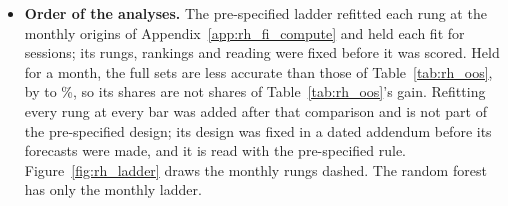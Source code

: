 \begin{itemize}
  ($k_{90} = \rhldEBTreeKninetyMax$ in the boosted trees and \rhldEBLinKninetyMax{} in the linear models), so under the
  reading fixed before the ladder was first scored the signal is \rhldEBAllBarVerdict{} in all five models, between
  concentrated (\rhldRuleKConc{} or fewer series) and dense and weak (no reduced rung at \rhldRulePct\%). Refitted
  monthly, the linear models read \rhldEBLinVerdictMonthly{} ($k_{90} = \rhldLinKninetyMax$). By day type
  (Table~\ref{tab:rh_channels_sparse}, Panel~B) the reading is \rhldEBLgbmOrdVerdict{} for LightGBM and XGBoost on
  ordinary days (\rhldEBTreeOrdKninetyMin{}--\rhldEBTreeOrdKninetyMax{} series keep \rhldRulePct\% of the gain) and
  for the linear models on FOMC statement days (\rhldEBLinEvKninetyMin{}--\rhldEBLinEvKninetyMax{} series), the two
  channels of Section~\ref{sec:rh_fi}. In the monthly version of the ladder, across windows of \rhcxWOne{} to
  \rhcxWLong{} trading days, the best number of series rises with the window, as a dense and weak signal predicts,
  only for \rhcxWhoKstarRisesBar{} (Appendix~\ref{app:rh_fi_scaling}); the window test is in
  Appendix~\ref{app:rh_fi_window}.
\item \textbf{Order of the analyses.} The pre-specified ladder refitted each rung at the \rhldNOrigins{} monthly
  origins of Appendix~\ref{app:rh_fi_compute} and held each fit for \rhldHoldSessions{} sessions; its rungs, rankings
  and reading were fixed before it was scored. Held for a month, the full sets are less accurate than those of
  Table~\ref{tab:rh_oos}, by \rhldPctMonthlyVsWalkMin{} to \rhldPctMonthlyVsWalkMax\%, so its shares are not shares of
  Table~\ref{tab:rh_oos}'s gain. Refitting every rung at every bar was added after that comparison and is not part of
  the pre-specified design; its design was fixed in a dated addendum before its forecasts were made, and it is read
  with the pre-specified rule. Figure~\ref{fig:rh_ladder} draws the monthly rungs dashed. The random forest has only
  the monthly ladder.
\end{itemize}

